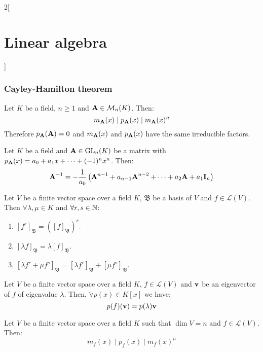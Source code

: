 \documentclass[../../../main.tex]{subfiles}
\begin{document}
\begin{multicols}{2}[\section{Linear algebra}]
    \subsubsection*{Cayley-Hamilton theorem}
    \begin{theorem}
        Let $K$ be a field, $n\geq 1$ and $\boldsymbol{\mathrm{A}}\in\mathcal{M}_n(K)$. Then: $$m_{\boldsymbol{\mathrm{A}}}(x)\mid p_{\boldsymbol{\mathrm{A}}}(x)\mid m_{\boldsymbol{\mathrm{A}}}(x)^n$$ Therefore $p_{\boldsymbol{\mathrm{A}}}(\boldsymbol{\mathrm{A}})=0$ and $m_{\boldsymbol{\mathrm{A}}}(x)$ and $p_{\boldsymbol{\mathrm{A}}}(x)$ have the same irreducible factors.
    \end{theorem}
    \begin{corollary}
        Let $K$ be a field and $\boldsymbol{\mathrm{A}}\in\mathrm{GL}_n(K)$ be a matrix with $p_{\boldsymbol{\mathrm{A}}}(x)=a_0+a_1x+\cdots+(-1)^nx^n$. Then: $$\boldsymbol{\mathrm{A}}^{-1}=-\frac{1}{a_0}\left(\boldsymbol{\mathrm{A}}^{n-1}+a_{n-1}\boldsymbol{\mathrm{A}}^{n-2}+\cdots+a_2\boldsymbol{\mathrm{A}}+a_1\boldsymbol{\mathrm{I}}_n\right)$$
    \end{corollary}
    \begin{lemma}
        Let $V$ be a finite vector space over a field $K$, $\mathfrak{B}$ be a basis of $V$ and $f\in\mathcal{L}(V)$. Then $\forall\lambda,\mu\in K$ and $\forall r,s\in\mathbb{N}$:
        \begin{enumerate}
            \item $[f^r]_\mathfrak{B}={\left([f]_\mathfrak{B}\right)}^r$.
            \item $[\lambda f]_\mathfrak{B}=\lambda[f]_\mathfrak{B}$.
            \item $[\lambda f^r+\mu f^s]_\mathfrak{B}=[\lambda f^r]_\mathfrak{B}+[\mu f^s]_\mathfrak{B}$.
        \end{enumerate}
    \end{lemma}
    \begin{lemma}
        Let $V$ be a finite vector space over a field $K$, $f\in\mathcal{L}(V)$ and $\boldsymbol{\mathrm{v}}$ be an eigenvector of $f$ of eigenvalue $\lambda$. Then, $\forall p(x)\in K[x]$ we have: $$p(f)(\boldsymbol{\mathrm{v}})=p(\lambda)\boldsymbol{\mathrm{v}}$$
    \end{lemma}
    \begin{theorem}
        Let $V$ be a finite vector space over a field $K$ such that $\dim V=n$ and $f\in\mathcal{L}(V)$. Then: $$m_f(x)\mid p_f(x)\mid m_f(x)^n$$
    \end{theorem}
    \begin{definition}

\end{definition}
\end{multicols}
\end{document}
